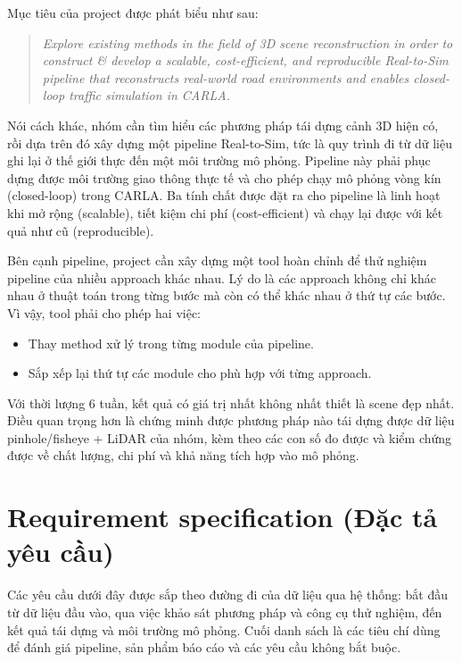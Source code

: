 Mục tiêu của project được phát biểu như sau:

\begin{quote}
  \itshape
  Explore existing methods in the field of 3D scene reconstruction
  in order to construct \& develop a scalable, cost-efficient, and reproducible Real-to-Sim pipeline
  that reconstructs real-world road environments
  and enables closed-loop traffic simulation in CARLA.
\end{quote}

Nói cách khác, nhóm cần tìm hiểu các phương pháp tái dựng cảnh 3D hiện có, rồi dựa trên đó xây dựng một pipeline Real-to-Sim, tức là quy trình đi từ dữ liệu ghi lại ở thế giới thực đến một môi trường mô phỏng. Pipeline này phải phục dựng được môi trường giao thông thực tế và cho phép chạy mô phỏng vòng kín (closed-loop) trong CARLA. Ba tính chất được đặt ra cho pipeline là linh hoạt khi mở rộng (scalable), tiết kiệm chi phí (cost-efficient) và chạy lại được với kết quả như cũ (reproducible).

Bên cạnh pipeline, project cần xây dựng một tool hoàn chỉnh để thử nghiệm pipeline của nhiều approach khác nhau. Lý do là các approach không chỉ khác nhau ở thuật toán trong từng bước mà còn có thể khác nhau ở thứ tự các bước. Vì vậy, tool phải cho phép hai việc:

\begin{itemize}
  \item Thay method xử lý trong từng module của pipeline.
  \item Sắp xếp lại thứ tự các module cho phù hợp với từng approach.
\end{itemize}

Với thời lượng 6 tuần, kết quả có giá trị nhất không nhất thiết là scene đẹp nhất. Điều quan trọng hơn là chứng minh được phương pháp nào tái dựng được dữ liệu pinhole/fisheye + LiDAR của nhóm, kèm theo các con số đo được và kiểm chứng được về chất lượng, chi phí và khả năng tích hợp vào mô phỏng.

\section{Requirement specification (Đặc tả yêu cầu)}

Các yêu cầu dưới đây được sắp theo đường đi của dữ liệu qua hệ thống: bắt đầu từ dữ liệu đầu vào, qua việc khảo sát phương pháp và công cụ thử nghiệm, đến kết quả tái dựng và môi trường mô phỏng. Cuối danh sách là các tiêu chí dùng để đánh giá pipeline, sản phẩm báo cáo và các yêu cầu không bắt buộc.

